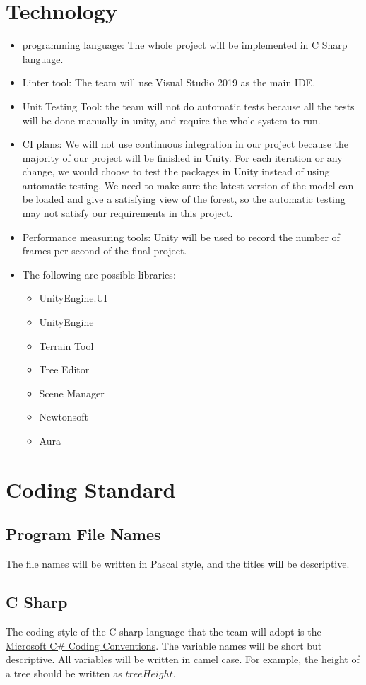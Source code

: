 \documentclass{article}
\begin{document}
\section{Technology}
\begin{itemize}
\item programming language: The whole project will be
implemented in C Sharp language.
\item Linter tool: The team will use Visual Studio 2019 as
the main IDE.
\item Unit Testing Tool: the team will not do automatic tests because all the tests will be done manually in unity, and require the whole system to run.
\item CI plans: We will not use continuous integration in
our project because the majority of our project will be
finished in Unity. For each iteration or any change, we
would choose to test the packages in Unity instead of
using automatic testing. We need to make sure the latest
version of the model can be loaded and give a satisfying
view of the forest, so the automatic testing may not
satisfy our requirements in this project.
\item Performance measuring tools: Unity will be used to
record the number of frames per second of the final
project. 

\item The following are possible libraries:
\begin{itemize}
\item UnityEngine.UI
\item UnityEngine
\item Terrain Tool
\item Tree Editor
\item Scene Manager
\item Newtonsoft
\item Aura
\end{itemize}

\end{itemize}

\section{Coding Standard}
\subsection{Program File Names}
The file names will be written in Pascal style, and the titles will be descriptive.

\subsection{C Sharp}
The coding style of the C sharp language that the team will adopt is the \href{https://learn.microsoft.com/en-us/dotnet/csharp/fundamentals/coding-style/coding-conventions}{Microsoft C\# Coding Conventions}. The variable names will be short but descriptive. All variables will be written in camel case. For example, the height of a tree should be written as $treeHeight$.
\end{document}
